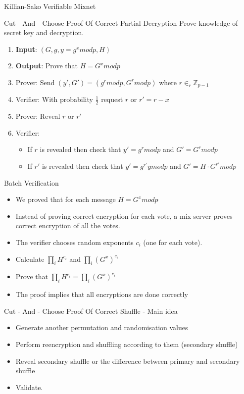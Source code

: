 \documentclass{beamer}
\begin{document}
\begin{frame}[allowframebreaks]{Killian-Sako Verifiable Mixnet \cite{SK95}}
\begin{block}{Cut - And - Choose Proof Of Correct Partial Decryption}
Prove knowledge of secret key and decryption.
\begin{enumerate}
\item \textbf{Input}: $(G,g,y=g^x mod p,H)$
\item \textbf{Output}: Prove that $H=G^x mod p$
\item Prover: Send $(y',G') = (g^r mod p,G^r mod p)$ where $r \in_r \mathbb{Z}_{p-1}$
\item Verifier: With probability $\frac{1}{2}$ request $r$ or $r'=r-x$ 
\item Prover: Reveal $r$ or $r'$
\item Verifier:
\begin{itemize}
	\item If $r$ is revealed then check that $y'=g^r mod p$ and  $G'=G^r mod p$
	\item If $r'$ is revealed then check that $y'=g^{r'} y mod p$ and $G'=H \cdot G^{r'} mod p$
\end{itemize}
\end{enumerate}
\end{block}

\begin{block}{Batch Verification}
\begin{itemize}
\item We proved that for each message  $H=G^{x} mod p$
\item Instead of proving correct encryption for each vote, a mix server proves correct encryption of all the votes.
\item The verifier chooses random exponents $c_i$ (one for each vote).
\item Calculate $\prod_{i} H^{c_i}$ and $\prod_{i} (G^{x})^{c_i}$
\item Prove that $\prod_{i} H^{c_i} = \prod_{i} (G^{x})^{c_i}$
\item The proof implies that all encryptions are done correctly
\end{itemize}
\end{block}

\begin{block}{Cut - And - Choose Proof Of Correct Shuffle - Main idea \cite{adidaPhd}}

\begin{itemize}
\item Generate another permutation and randomisation values
\item Perform reencryption and shuffling according to them (secondary shuffle)
\item Reveal secondary shuffle or the difference between primary and secondary shuffle
\item Validate.
\end{itemize}
\end{block}


\end{frame}
\end{document}
